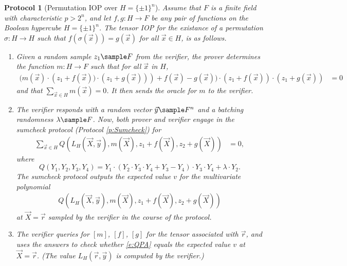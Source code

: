 \documentclass[11pt]{article}
\newtheorem{protocol}[]{Protocol}
\theoremstyle{definition}
\theoremstyle{remark}
\begin{document}
\begin{protocol}[Permutation IOP over $H=\{\pm 1\}^n$]
\label{prot:PA}
Assume that $F$ is a finite field with characteristic $p > 2^n$, and let $f,g :H\rightarrow F$ be any pair of functions on the Boolean hypercube $H=\{\pm 1\}^n$.
The tensor IOP for the existance of a permutation $\sigma: H\longrightarrow H$ such that $f(\sigma(\vec x))=g(\vec x)$ for all $\vec x\in H$,
 is as follows.
\begin{enumerate} 
\item
\label{i:PAstep1}
Given a random sample $z_1 \sample F$ from the verifier, the prover determines the function $m:H\rightarrow F$ such that for all $\vec x$ in $H$,
\begin{align} 
\label{e:m}
	\Big(m(\vec x)\cdot \left(z_1 + f(\vec x))\cdot (z_1 + g(\vec x)) \right) + f(\vec x) - g(\vec x)\Big)\cdot  (z_1 + f(\vec x))\cdot (z_1 + g(\vec x)) &= 0
\end{align}
and that $\sum_{\vec x\in H} m(\vec x) = 0$.
It then sends the oracle for $m$ to the verifier.

\item
\label{i:PAstep2}
The verifier responds with a random vector $\vec y \sample F^n$ and a batching randomness $\lambda\sample F$.
Now, both prover and verifier engage in the sumcheck protocol (Protocol \ref{p:Sumcheck}) for 
\begin{align} 
\label{e:sumcheckm}
	\sum_{\vec x \in H} Q(L_H(\vec X, \vec y), m(\vec X),  z_1 + f(\vec X),  z_2 + g(\vec X))&= 0,
\end{align}
where 
\begin{equation*}
Q(Y_1 , Y_2, Y_3, Y_4) =   
Y_1 \cdot  \left(Y_2\cdot Y_3\cdot Y_4 + Y_3 - Y_4\right)\cdot  Y_3 \cdot Y_4 +  \lambda \cdot Y_2.
\end{equation*}
The sumcheck protocol outputs the expected value $v$ for the multivariate polynomial 
\begin{equation}
\label{e:QPA}
\begin{aligned}
Q(L_H(\vec X, \vec y), m(\vec X), z_1 + f(\vec X),  z_2 + g(\vec X))
\end{aligned}
\end{equation}
at $\vec X=\vec r$ sampled by the verifier in the course of the protocol.

\item
The verifier queries for  $[m]$, $[f]$, $[g]$ for the tensor associated with $\vec r$, and uses the answers 
to check whether \eqref{e:QPA} equals the expected value $v$ at $\vec X = \vec r$. 
(The value $L_H(\vec r, \vec y)$ is computed by the verifier.)
\end{enumerate}
\end{protocol}
\end{document}
